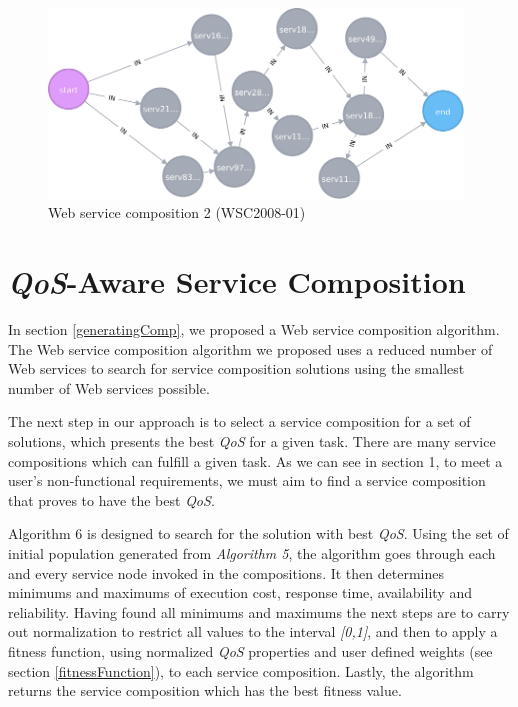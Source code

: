 \begin{figure}[H]
\includegraphics[width=11cm]{svg-chapter3-c2.pdf}
\centering
\caption{Web service composition 2 (WSC2008-01)}
\label{fig:c3compEg2} 
\end{figure} 

\section{\emph{QoS}-Aware Service Composition}

In section \ref{generatingComp}, we proposed a Web service composition algorithm. The Web service composition algorithm we proposed uses a reduced number of Web services to search for service composition solutions using the smallest number of Web services possible.\par

The next step in our approach is to select a service composition for a set of solutions, which presents the best \emph{QoS} for a given task. There are many service compositions which can fulfill a given task. As we can see in section 1, to meet a user's non-functional requirements, we must aim to find a service composition that proves to have the best \emph{QoS}.\par

Algorithm 6 is designed to search for the solution with best \emph{QoS}. Using the set of initial population generated from \emph{Algorithm 5}, the algorithm goes through each and every service node invoked in the compositions. It then determines minimums and maximums of execution cost, response time, availability and reliability. Having found all minimums and maximums the next steps are to carry out normalization to restrict all values to the interval \emph{[0,1]}, and then to apply a fitness function, using normalized \emph{QoS} properties and user defined weights (see section \ref{fitnessFunction}), to each service composition. Lastly, the algorithm returns the service composition which has the best fitness value. \par

